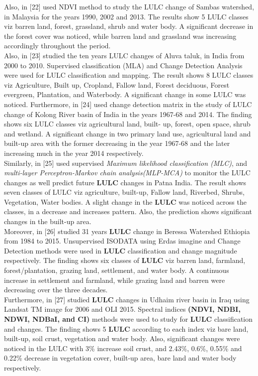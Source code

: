 \documentclass[10pt]{report}
\begin{document}
\begin{flushleft}
		Also, in [22] used NDVI method to study the LULC change of	Sambas watershed, in Malaysia for the years 1990, 2002 and 2013.	The results show 5 LULC classes viz barren land, forest, grassland,	shrub and water body. A significant decrease in the forest cover was noticed, while barren land and grassland was increasing accordingly throughout the period.\\
		
		Also, in [23] studied the ten years LULC changes of Aluva taluk, in India from 2000 to 2010. Supervised classification (MLA) and	Change Detection Analysis were used for LULC classification and	mapping. The result shows 8 LULC classes viz Agriculture, Built	up, Cropland, Fallow land, Forest deciduous, Forest evergreen,	Plantation, and Waterbody. A significant change in some LULC	was noticed.	Furthermore, in [24] used change detection matrix in the study of
		LULC change of Kolong River basin of India in the years 1967-68 and 2014. The finding shows six LULC classes viz agricultural	land, built- up, forest, open space, shrub and wetland. A significant change in two primary land use, agricultural land and built-up	area with the former decreasing in the year 1967-68 and the later
		increasing much in the year 2014 respectively.\\
		
		Similarly, in [25] used supervised \emph{Maximum likelihood classification (MLC)}, and \emph{multi-layer Perceptron-Markov chain analysis(MLP-MCA)} to monitor the LULC changes as well predict future	\textbf{LULC} changes in Patna India. The result shows seven classes of	LULC viz agriculture, built-up, Fallow land, Riverbed, Shrubs,	Vegetation, Water bodies. A slight change in the \textbf{LULC} was noticed across the classes, in a decrease and increases pattern. Also,	the prediction shows significant changes in the built-up area.\\
		Moreover, in [26] studied 31 years \textbf{LULC} change in Beressa Watershed Ethiopia from 1984 to 2015. Unsupervised ISODATA
		using Erdas imagine and Change Detection methods were used in
		\textbf{LULC} classification and change magnitude respectively. The finding shows six classes of \textbf{LULC} viz barren land, farmland, forest/plantation, grazing land, settlement, and water body. A continuous increase in settlement and farmland, while grazing land and	barren were decreasing over the three decades.\\
		
		Furthermore, in [27] studied \textbf{LULC} changes in Udhaim river basin	in Iraq using Landsat TM image for 2006 and OLI 2015. Spectral	indices \textbf{(NDVI, NDBI, NDWI, NDBaI, and CI)} methods were	used to study for \textbf{LULC} classification and changes. The finding	shows 5 \textbf{LULC} according to each index viz bare land, built-up,	soil crust, vegetation and water body. Also, significant changes	were noticed in the LULC with 3\% increase soil crust, and 2.43\%,	0.6\%, 0.55\% and 0.22\% decrease in vegetation cover, built-up	area, bare land and water body respectively.\\
		

\end{flushleft}
\end{document}
